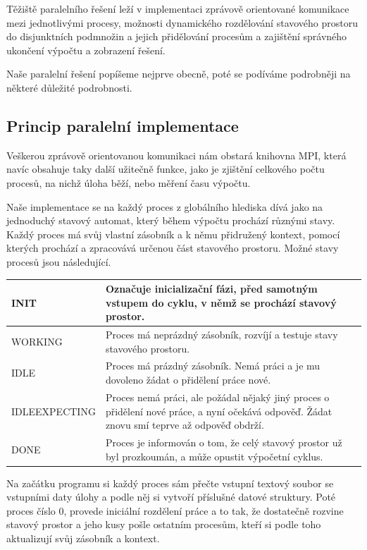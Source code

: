 \documentclass[12pt]{article}
\theoremstyle{definition}
\begin{document}
Těžiště paralelního řešení leží v implementaci zprávově orientované komunikace mezi
jednotlivými procesy, možnosti dynamického rozdělování stavového prostoru do disjunktních podmnožin a jejich
přidělování procesům a zajištění správného ukončení výpočtu a zobrazení řešení.

Naše paralelní řešení popíšeme nejprve obecně, poté se podíváme podrobněji na některé důležité podrobnosti.
\subsection{Princip paralelní implementace}
Veškerou zprávově orientovanou komunikaci nám obstará knihovna MPI, která navíc obsahuje
taky další užitečně funkce, jako je zjištění celkového počtu procesů, na nichž úloha běží, nebo měření času výpočtu.

Naše implementace se na každý proces z globálního hlediska dívá jako na jednoduchý stavový automat, který
během výpočtu prochází různými stavy. Každý proces má svůj vlastní zásobník a k němu přidružený kontext,
pomocí kterých prochází a zpracovává určenou část stavového prostoru. Možné stavy procesů jsou následující.
\newline
\begin{center}
	\begin{tabular}{p{4cm}|p{8cm}}
		INIT & Označuje inicializační fázi, před samotným vstupem do cyklu, v němž se prochází stavový prostor.\\
		\hline
		WORKING & Proces má neprázdný zásobník, rozvíjí a testuje stavy stavového prostoru.\\
		\hline
		IDLE & Proces má prázdný zásobník. Nemá práci a je mu dovoleno žádat o přidělení práce nové.\\
		\hline
		IDLE\textunderscore EXPECTING & Proces nemá práci, ale požádal nějaký jiný proces o přidělení nové práce, a nyní
		očekává odpověď. Žádat znovu smí teprve až odpověď obdrží.\\
		\hline
		DONE & Proces je informován o tom, že celý stavový prostor už byl prozkoumán, a může opustit výpočetní cyklus.\\
	\end{tabular}
	\newline
\end{center}


Na začátku programu si každý proces sám přečte vstupní textový soubor se vstupními daty úlohy
a podle něj si vytvoří příslušné datové struktury. Poté proces číslo $0$, provede
iniciální rozdělení práce a to tak, že dostatečně rozvine stavový prostor a jeho kusy pošle ostatním procesům,
kteří si podle toho aktualizují svůj zásobník a kontext.
\end{document}
